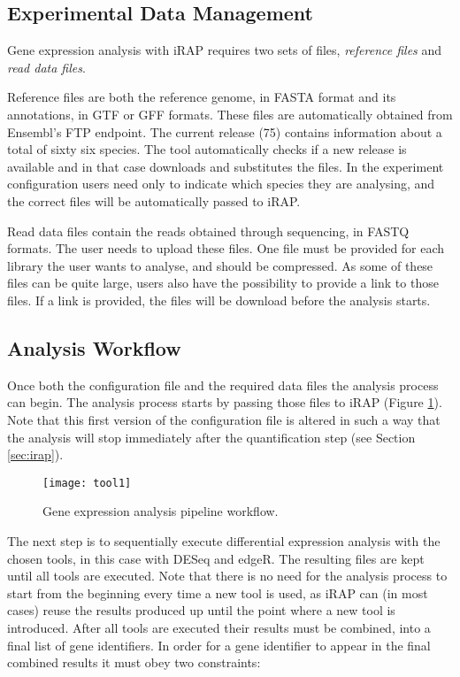 \subsection{Experimental Data Management}

Gene expression analysis with iRAP requires two sets of files, \emph{reference
files} and \emph{read data files}.

Reference files are both the reference genome, in FASTA format and its
annotations, in GTF or GFF formats. These files are automatically obtained from
Ensembl's FTP endpoint. The current release (75) contains information about a
total of sixty six species. The tool automatically checks if a new release is
available and in that case downloads and substitutes the files. In the
experiment configuration users need only to indicate which species they are
analysing, and the correct files will be automatically passed to iRAP.

Read data files contain the reads obtained through sequencing, in FASTQ formats.
The user needs to upload these files. One file must be provided for each library
the user wants to analyse, and should be compressed. As some of these files can
be quite large, users also have the possibility to provide a link to those
files. If a link is provided, the files will be download before the analysis
starts.

\subsection{Analysis Workflow}

Once both the configuration file and the required data files the analysis
process can begin. The analysis process starts by passing those files to iRAP
(Figure \ref{fig:tool1}). Note that this first version of the configuration file
is altered in such a way that the analysis will stop immediately after the
quantification step (see Section \ref{sec:irap}).

\begin{figure}[!htb]
  \begin{center}
    \leavevmode
    \texttt{[image: tool1]}
    \caption[Gene expression analysis pipeline workflow]{
      Gene expression analysis pipeline workflow.
    }
    \label{fig:tool1}
  \end{center}
\end{figure}

The next step is to sequentially execute differential expression analysis with
the chosen tools, in this case with DESeq and edgeR. The resulting files are
kept until all tools are executed. Note that there is no need for the analysis
process to start from the beginning every time a new tool is used, as iRAP can
(in most cases) reuse the results produced up until the point where a new tool
is introduced. After all tools are executed their results must be combined, into
a final list of gene identifiers. In order for a gene identifier to appear in
the final combined results it must obey two constraints:

